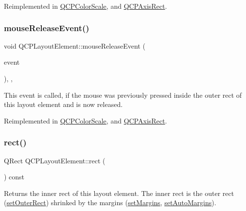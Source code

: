 Reimplemented in \hyperlink{class_q_c_p_color_scale_a5df6ad81b2ad045878d276c2d5be7120}{Q\+C\+P\+Color\+Scale}, and \hyperlink{class_q_c_p_axis_rect_a77501dbeccdac7256f7979b05077c04e}{Q\+C\+P\+Axis\+Rect}.

\hypertarget{class_q_c_p_layout_element_ae526ac828cce1e5bb94eaa85776d7404}{}\label{class_q_c_p_layout_element_ae526ac828cce1e5bb94eaa85776d7404} 
\subsubsection{\texorpdfstring{mouse\+Release\+Event()}{mouseReleaseEvent()}}
{\footnotesize\ttfamily void Q\+C\+P\+Layout\+Element\+::mouse\+Release\+Event (\begin{DoxyParamCaption}\item[{Q\+Mouse\+Event $\ast$}]{event }\end{DoxyParamCaption})\hspace{0.3cm}{\ttfamily [inline]}, {\ttfamily [protected]}, {\ttfamily [virtual]}}

This event is called, if the mouse was previously pressed inside the outer rect of this layout element and is now released. 

Reimplemented in \hyperlink{class_q_c_p_color_scale_a0916613d20901950fc6d00c6f99fe0a1}{Q\+C\+P\+Color\+Scale}, and \hyperlink{class_q_c_p_axis_rect_adf6c99780cea55ab39459a6eaad3a94a}{Q\+C\+P\+Axis\+Rect}.

\hypertarget{class_q_c_p_layout_element_a208effccfe2cca4a0eaf9393e60f2dd4}{}\label{class_q_c_p_layout_element_a208effccfe2cca4a0eaf9393e60f2dd4} 
\subsubsection{\texorpdfstring{rect()}{rect()}}
{\footnotesize\ttfamily Q\+Rect Q\+C\+P\+Layout\+Element\+::rect (\begin{DoxyParamCaption}{ }\end{DoxyParamCaption}) const\hspace{0.3cm}{\ttfamily [inline]}}

Returns the inner rect of this layout element. The inner rect is the outer rect (\hyperlink{class_q_c_p_layout_element_a38975ea13e36de8e53391ce41d94bc0f}{set\+Outer\+Rect}) shrinked by the margins (\hyperlink{class_q_c_p_layout_element_a8f450b1f3f992ad576fce2c63d8b79cf}{set\+Margins}, \hyperlink{class_q_c_p_layout_element_accfda49994e3e6d51ed14504abf9d27d}{set\+Auto\+Margins}).

